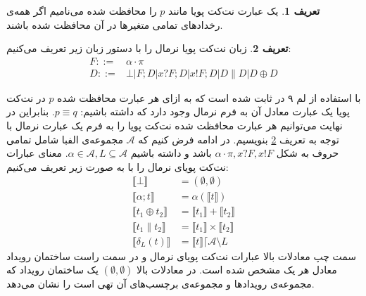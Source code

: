 \documentclass[
msc,
irfonts
]{./tex/tehran-thesis}
\newcommand{\پ}{پروژه/پایان‌نامه/رساله }
\theoremstyle{definition}
\newtheorem{definition}{تعریف}[section]
\theoremstyle{theorem}
\theoremstyle{definition}
\numberwithin{algorithm}{chapter}
\newcommand{\sem}[1]{\llbracket #1 \rrbracket}
\newcommand{\e}{\emptyset}
\newcommand{\mc}[1]{\mathcal{#1}}
\begin{document}
\begin{definition}
    یک عبارت نت‌کت پویا مانند
    $p$
    را محافظت‌ شده
    می‌نامیم اگر همه‌ی رخداد‌های تمامی متغیر‌ها در آن محافظت شده باشند.
\end{definition}

\begin{definition}
    \label{def:dynetkat-normal}
    زبان نت‌کت پویا‌ نرمال را با دستور زبان زیر تعریف می‌کنیم:
    \begin{align*}
        F ::= & \alpha\cdot\pi                                          \\
        D ::= & \bot | F;D | x?F;D | x!F;D | D \parallel D | D \oplus D
    \end{align*}
\end{definition}
با استفاده از لم ۹ در 
\cite{dynetkat}
ثابت شده است که
به ازای هر عبارت محافظت شده
$p$
در نت‌کت پویا یک عبارت معادل آن به فرم نرمال وجود دارد که داشته باشیم:
$p \equiv q$.
بنابراین در نهایت می‌توانیم هر عبارت محافظت شده نت‌کت پویا را به فرم یک عبارت نرمال
با توجه به تعریف
\ref{def:dynetkat-normal}
بنویسیم.
در ادامه فرض کنیم که
$\mc{A}$
مجموعه‌ی الفبا شامل تمامی حروف به شکل
$\alpha\cdot\pi,x?F,x!F$
باشد و داشته باشیم
$\alpha \in \mc{A}, L \subseteq \mc{A}$.
معنای عبارات نت‌کت پویای نرمال را با به صورت زیر تعریف می‌کنیم:
\begin{align*}
    \sem{\bot}              & = (\e,\e)                               \\
    \sem{\alpha;t}          & = \alpha(\sem{t})                       \\
    \sem{t_1 \oplus t_2}    & = \sem{t_1} + \sem{t_2}                 \\
    \sem{t_1 \parallel t_2} & = \sem{t_1} \times \sem{t_2}            \\
    \sem{\delta_{L}(t)}     & = \sem{t}\lceil \mathcal{A} \setminus L
\end{align*}
سمت چپ معادلات بالا عبارات نت‌کت پویای نرمال و در سمت راست ساختمان رویداد معادل هر یک مشخص شده است.
در معادلات بالا
$(\e,\e)$
یک ساختمان رویداد که مجموعه‌ی رویداد‌ها و مجموعه‌ی برچسب‌های آن تهی است را نشان می‌دهد. 
\end{document}
